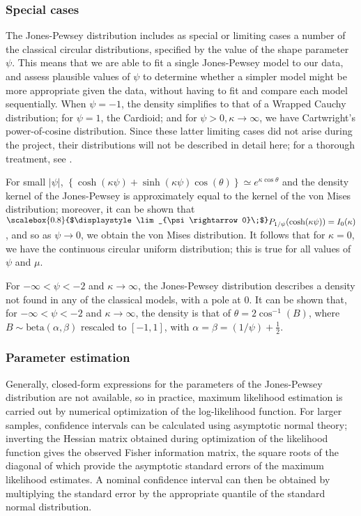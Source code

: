 \documentclass[../../ArchStats.tex]{subfiles}
\newcommand{\Lim}[1]{\raisebox{0.5ex}{\scalebox{0.8}{$\displaystyle \lim_{#1}\;$}}}
\begin{document}
\subsubsection{Special cases}

The Jones-Pewsey distribution includes as special or limiting cases a number of the classical circular distributions, specified by the value of the shape parameter $\psi$. This means that we are able to fit a single Jones-Pewsey model to our data, and assess plausible values of $\psi$ to determine whether a simpler model might be more appropriate given the data, without having to fit and compare each model sequentially. When $\psi = -1$, the density simplifies to that of a Wrapped Cauchy distribution; for $\psi = 1$, the Cardioid; and for $\psi > 0, \kappa \rightarrow \infty$, we have Cartwright's power-of-cosine distribution. Since these latter limiting cases did not arise during the project, their distributions will  not be described in detail here; for a thorough treatment, see \cite{Jones2005}. 

For small $\vert \psi \vert$, $\left\lbrace \cosh(\kappa\psi) + \sinh(\kappa\psi) \cos(\theta) \right\rbrace \simeq e^{\kappa \cos \theta}$ and the density kernel of the Jones-Pewsey is approximately equal to the kernel of the von Mises distribution; moreover, it can be shown that $\Lim{\psi \rightarrow 0} P_{1/\psi}(\cosh(\kappa\psi)) = I_0(\kappa)$, and so as $\psi \rightarrow 0$, we obtain the von Mises distribution. It follows that for $\kappa = 0$, we have the continuous circular uniform distribution; this is true for all values of $\psi$ and $\mu$.

For $-\infty < \psi < -2$ and $\kappa \rightarrow \infty$, the Jones-Pewsey distribution describes a density not found in any of the classical models, with a pole at 0. It can be shown that, for $-\infty < \psi < -2$ and $\kappa \rightarrow \infty$, the density is that of $\theta = 2 \cos^{-1}(B)$, where $B \sim \text{beta}(\alpha, \beta)$ rescaled to  $[-1,1]$, with $\alpha = \beta = (1/\psi) + \frac{1}{2}$.


\subsubsection{Parameter estimation}

Generally, closed-form expressions for the parameters of the Jones-Pewsey distribution are not available, so in practice, maximum likelihood estimation is carried out by numerical optimization of the log-likelihood function. For larger samples, confidence intervals can be calculated using asymptotic normal theory; inverting the Hessian matrix obtained during optimization of the likelihood function gives the observed Fisher information matrix, the square roots of the diagonal of which provide the asymptotic standard errors of the maximum likelihood estimates. A nominal confidence interval can then be obtained by multiplying the standard error by the appropriate quantile of the standard normal distribution.
\end{document}
